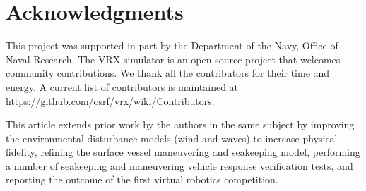 \documentclass[utf8]{frontiersSCNS} %
\newif\ifoverleaf %
\begin{document}

\section*{Acknowledgments}
This project was supported in part by the Department of the Navy, Office of Naval Research. The VRX simulator is an open source project that welcomes community contributions. We thank all the contributors for their time and energy. A current list of contributors is maintained at \url{https://github.com/osrf/vrx/wiki/Contributors}.

This article extends prior work by the authors in the same subject \citep{bingham19toward} by improving the environmental disturbance models (wind and waves) to increase physical fidelity, refining the surface vessel maneuvering and seakeeping model, %
performing a number of seakeeping and maneuvering vehicle response verification tests, %
and reporting the outcome of the first virtual robotics competition.

 

\ifoverleaf

\else

\fi
\end{document}
